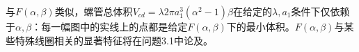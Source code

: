 与$F(\alpha,\beta)$类似，螺管总体积$V_{cd}=\lambda 2\pi a_1^3(\alpha^2-1)\beta$在给定的$\lambda,a_1$条件下仅依赖于$\alpha,\beta$：每一幅图中的实线上的点都是给定$F(\alpha,\beta)$下的最小体积。$F(\alpha,\beta)$与某些特殊线圈相关的显著特征将在问题3.1中论及。

\begin{figure}
	\centering


\end{figure}
